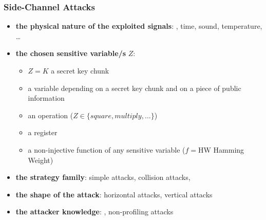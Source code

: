 \begin{frame}
\frametitle{Side-Channel Attacks}
\begin{itemize}
\item \textbf{the physical nature of the exploited signals}: , time, sound, temperature, \dots
\item \textbf{the chosen sensitive variable/s} $Z$:
\begin{itemize}
\item $Z = K$ a secret key chunk
\item {} a variable depending on a secret key chunk and on a piece of public information
\item an operation (\eg $Z \in \{ square, multiply, \dots\}$)
\item a register 
\item {} a non-injective function of any sensitive variable (\eg $f = \mathrm{HW}$ Hamming Weight)
\end{itemize}
\item \textbf{the strategy family}: simple attacks, collision attacks, 
\item \textbf{the shape of the attack}: horizontal attacks, vertical attacks
\item \textbf{the attacker knowledge}: , non-profiling attacks
\end{itemize}
\end{frame}





